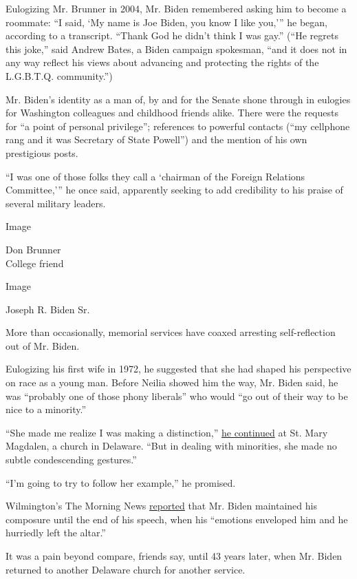 Eulogizing Mr. Brunner in 2004, Mr. Biden remembered asking him to
become a roommate: ``I said, `My name is Joe Biden, you know I like
you,''' he began, according to a transcript. ``Thank God he didn't think
I was gay.'' (``He regrets this joke,'' said Andrew Bates, a Biden
campaign spokesman, ``and it does not in any way reflect his views about
advancing and protecting the rights of the L.G.B.T.Q. community.'')

Mr. Biden's identity as a man of, by and for the Senate shone through in
eulogies for Washington colleagues and childhood friends alike. There
were the requests for ``a point of personal privilege''; references to
powerful contacts (``my cellphone rang and it was Secretary of State
Powell'') and the mention of his own prestigious posts.

``I was one of those folks they call a `chairman of the Foreign
Relations Committee,''' he once said, apparently seeking to add
credibility to his praise of several military leaders.

Image

Don Brunner\\
College friend

Image

Joseph R. Biden Sr.

More than occasionally, memorial services have coaxed arresting
self-reflection out of Mr. Biden.

Eulogizing his first wife in 1972, he suggested that she had shaped his
perspective on race as a young man. Before Neilia showed him the way,
Mr. Biden said, he was ``probably one of those phony liberals'' who
would ``go out of their way to be nice to a minority.''

``She made me realize I was making a distinction,''
\href{https://www.newspapers.com/clip/49364956/the-morning-news/}{he
continued} at St. Mary Magdalen, a church in Delaware. ``But in dealing
with minorities, she made no subtle condescending gestures.''

``I'm going to try to follow her example,'' he promised.

Wilmington's The Morning News
\href{https://www.newspapers.com/clip/49364956/the-morning-news/}{reported}
that Mr. Biden maintained his composure until the end of his speech,
when his ``emotions enveloped him and he hurriedly left the altar.''

It was a pain beyond compare, friends say, until 43 years later, when
Mr. Biden returned to another Delaware church for another service.


